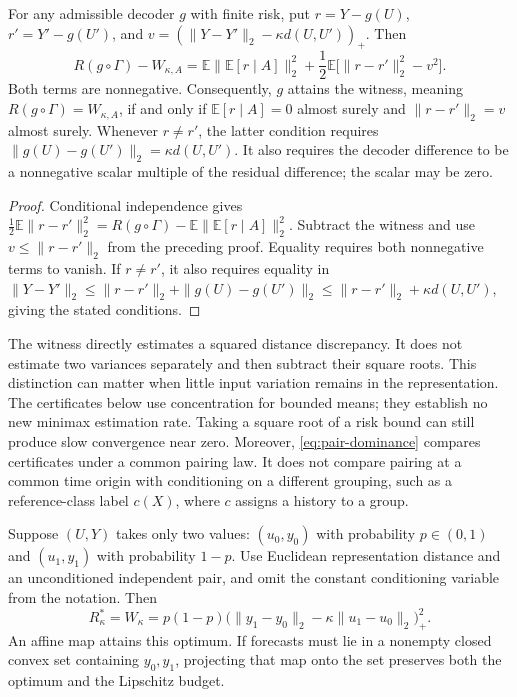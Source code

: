 \begin{proposition}
\label{prop:witness-slack}
For any admissible decoder $g$ with finite risk, put
$r=Y-g(U)$, $r'=Y'-g(U')$, and
$v=(\|Y-Y'\|_2-\kappa d(U,U'))_+$. Then
\begin{equation}
 R(g\circ\Gamma)-W_{\kappa,A}
 =\mathbb E\|\mathbb E[r\mid A]\|_2^2
   +\frac12\mathbb E\bigl[\|r-r'\|_2^2-v^2\bigr].
 \label{eq:witness-slack}
\end{equation}
Both terms are nonnegative. Consequently, $g$ attains the witness, meaning
$R(g\circ\Gamma)=W_{\kappa,A}$, if and only if
$\mathbb E[r\mid A]=0$ almost surely and
$\|r-r'\|_2=v$ almost surely. Whenever $r\ne r'$, the latter condition requires
$\|g(U)-g(U')\|_2=\kappa d(U,U')$. It also requires the decoder
difference to be a nonnegative scalar multiple of the residual difference;
the scalar may be zero.
\end{proposition}

\begin{proof}
Conditional independence gives
$\frac12\mathbb E\|r-r'\|_2^2
=R(g\circ\Gamma)-\mathbb E\|\mathbb E[r\mid A]\|_2^2$.
Subtract the witness and use $v\leq\|r-r'\|_2$ from the preceding proof.
Equality requires both nonnegative terms to vanish. If $r\ne r'$, it
also requires equality in
$\|Y-Y'\|_2\leq\|r-r'\|_2+\|g(U)-g(U')\|_2
\leq\|r-r'\|_2+\kappa d(U,U')$, giving the stated conditions.
\end{proof}

The witness directly estimates a squared distance discrepancy. It does not
estimate two variances separately and then subtract their square roots.
This distinction can matter when little input variation remains in the
representation. The certificates below use concentration for bounded means;
they establish no new minimax estimation rate. Taking a square root of a risk
bound can still produce slow convergence near zero. Moreover,
\eqref{eq:pair-dominance} compares certificates under a common pairing law.
It does not compare pairing at a common time origin with conditioning on a
different grouping, such as a reference-class label $c(X)$, where $c$
assigns a history to a group.

\begin{proposition}
\label{prop:two-atom}
Suppose $(U,Y)$ takes only two values: $(u_0,y_0)$ with probability
$p\in(0,1)$ and $(u_1,y_1)$ with probability $1-p$. Use Euclidean
representation distance and an unconditioned independent pair, and omit the
constant conditioning variable from the notation. Then
\begin{equation}
 R^*_\kappa
 =W_\kappa
 =p(1-p)\bigl(\|y_1-y_0\|_2
                 -\kappa\|u_1-u_0\|_2\bigr)_+^2.
 \label{eq:two-atom-optimum}
\end{equation}
An affine map attains this optimum. If forecasts must lie in a nonempty
closed convex set containing $y_0,y_1$, projecting that map onto the set
preserves both the optimum and the Lipschitz budget.
\end{proposition}

